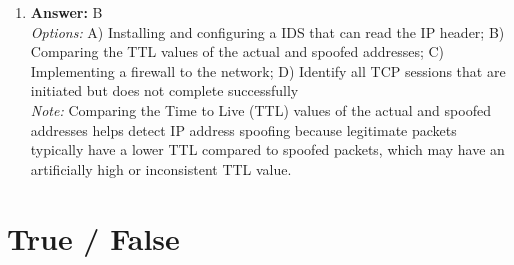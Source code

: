 \documentclass[12pt]{article}
\begin{document}
\begin{enumerate}[label=\arabic*.]
\item \textbf{Answer:} B
\\ \textit{Options:} A) Installing and configuring a IDS that can read the IP header; B) Comparing the TTL values of the actual and spoofed addresses; C) Implementing a firewall to the network; D) Identify all TCP sessions that are initiated but does not complete successfully
\\ \textit{Note:} Comparing the Time to Live (TTL) values of the actual and spoofed addresses helps detect IP address spoofing because legitimate packets typically have a lower TTL compared to spoofed packets, which may have an artificially high or inconsistent TTL value.
\end{enumerate}

\section*{True / False}
\end{document}
